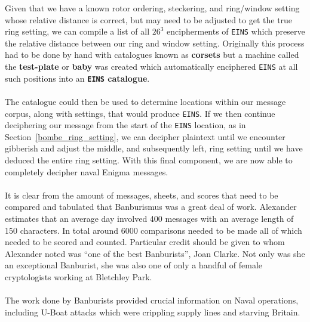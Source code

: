 \noindent Given that we have a known rotor ordering, steckering,
and ring/window setting whose relative distance is correct, but may
need to be adjusted to get the true ring setting, we can compile a
list of all $26^3$ encipherments of \texttt{EINS} which preserve
the relative distance between our ring and window setting.
Originally this process had to be done by hand with catalogues
known as {\bf{corsets}} but a machine called the {\bf{test-plate}}
or {\bf{baby}} was created which automatically enciphered
\texttt{EINS} at all such positions into an {\bf{\texttt{EINS} catalogue}}.
\\\\The catalogue could then be used to determine locations within our
message corpus, along with settings, that would produce
\texttt{EINS}. If we then continue deciphering our message from the
start of the \texttt{EINS} location, as in
Section~\ref{bombe_ring_setting}, we can decipher plaintext until we
encounter gibberish and adjust the middle, and subsequently left, ring setting
until we have deduced the entire ring setting. With this final
component, we are now able to completely decipher naval Enigma messages.
\\\\It is clear from the amount of messages, sheets, and scores
that need to be compared and tabulated that Banburismus was a great
deal of work. Alexander estimates that an average day involved 400
messages with an average length of 150 characters. In total around
6000 comparisons needed to be made all of which needed to be scored
and counted. Particular credit should be given to whom Alexander
noted was ``one of the best Banburists'', Joan Clarke. Not only was
she an exceptional Banburist, she was also one of only a handful of
female cryptologists working at Bletchley Park.
\\\\The work done by Banburists provided crucial information on
Naval operations, including U-Boat attacks which were crippling
supply lines and starving Britain.

